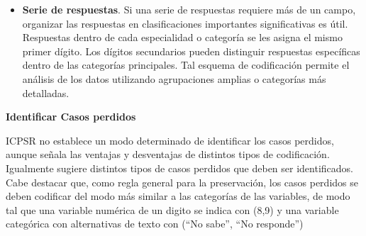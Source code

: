 \documentclass[
  spanish,
  a4paper,
  oneside]{scrbook}
\begin{document}
\begin{itemize}
  más de un código a la respuesta de una entrevista, esto resalta
  problemas o ambigüedades en el esquema de codificación. Esta
  codificación de verificación proporciona un medio importante de
  control de calidad en el proceso de codificación.
\item
  \textbf{Serie de respuestas}. Si una serie de respuestas requiere más
  de un campo, organizar las respuestas en clasificaciones importantes
  significativas es útil. Respuestas dentro de cada especialidad o
  categoría se les asigna el mismo primer dígito. Los dígitos
  secundarios pueden distinguir respuestas específicas dentro de las
  categorías principales. Tal esquema de codificación permite el
  análisis de los datos utilizando agrupaciones amplias o categorías más
  detalladas.
\end{itemize}

\textbf{Identificar Casos perdidos}

ICPSR no establece un modo determinado de identificar los casos
perdidos, aunque señala las ventajas y desventajas de distintos tipos de
codificación. Igualmente sugiere distintos tipos de casos perdidos que
deben ser identificados. Cabe destacar que, como regla general para la
preservación, los casos perdidos se deben codificar del modo más similar
a las categorías de las variables, de modo tal que una variable numérica
de un digito se indica con (8,9) y una variable categórica con
alternativas de texto con (``No sabe'', ``No responde'')
\end{document}
